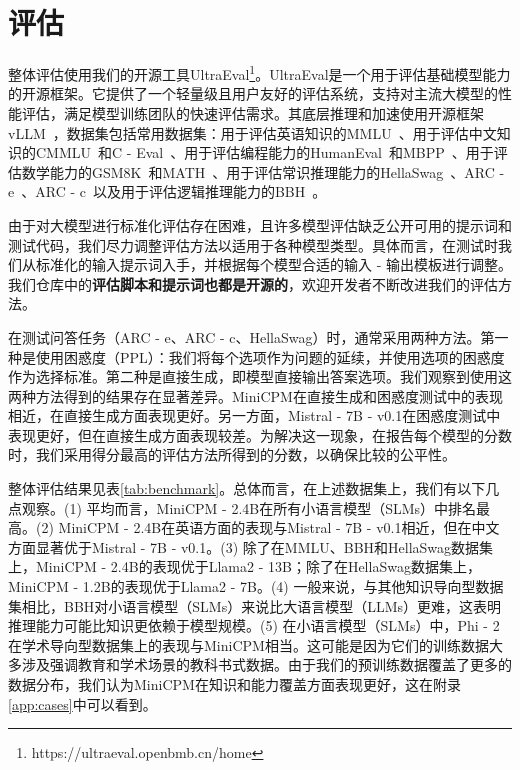 \section{评估}
\label{sec:evaluation}
整体评估使用我们的开源工具UltraEval\footnote{https://ultraeval.openbmb.cn/home}。UltraEval是一个用于评估基础模型能力的开源框架。它提供了一个轻量级且用户友好的评估系统，支持对主流大模型的性能评估，满足模型训练团队的快速评估需求。其底层推理和加速使用开源框架vLLM~\citep{kwon2023efficient}，数据集包括常用数据集：用于评估英语知识的MMLU~\citep{hendrycks2020measuring}、用于评估中文知识的CMMLU~\citep{li2024cmmlu}和C - Eval~\citep{huang2024c}、用于评估编程能力的HumanEval~\citep{chen2021evaluating}和MBPP~\citep{austin2021program}、用于评估数学能力的GSM8K~\citep{cobbe2021training}和MATH~\citep{hendrycks2021measuring}、用于评估常识推理能力的HellaSwag~\citep{zellers2019hellaswag}、ARC - e~\citep{clark2018think}、ARC - c~\citep{clark2018think}以及用于评估逻辑推理能力的BBH~\citep{suzgun2022challenging}。

由于对大模型进行标准化评估存在困难，且许多模型评估缺乏公开可用的提示词和测试代码，我们尽力调整评估方法以适用于各种模型类型。具体而言，在测试时我们从标准化的输入提示词入手，并根据每个模型合适的输入 - 输出模板进行调整。我们仓库中的\textbf{评估脚本和提示词也都是开源的}，欢迎开发者不断改进我们的评估方法。

在测试问答任务（ARC - e、ARC - c、HellaSwag）时，通常采用两种方法。第一种是使用困惑度（PPL）：我们将每个选项作为问题的延续，并使用选项的困惑度作为选择标准。第二种是直接生成，即模型直接输出答案选项。我们观察到使用这两种方法得到的结果存在显著差异。MiniCPM在直接生成和困惑度测试中的表现相近，在直接生成方面表现更好。另一方面，Mistral - 7B - v0.1在困惑度测试中表现更好，但在直接生成方面表现较差。为解决这一现象，在报告每个模型的分数时，我们采用得分最高的评估方法所得到的分数，以确保比较的公平性。

整体评估结果见表\ref{tab:benchmark}。总体而言，在上述数据集上，我们有以下几点观察。(1) 平均而言，MiniCPM - 2.4B在所有小语言模型（SLMs）中排名最高。(2) MiniCPM - 2.4B在英语方面的表现与Mistral - 7B - v0.1相近，但在中文方面显著优于Mistral - 7B - v0.1。(3) 除了在MMLU、BBH和HellaSwag数据集上，MiniCPM - 2.4B的表现优于Llama2 - 13B；除了在HellaSwag数据集上，MiniCPM - 1.2B的表现优于Llama2 - 7B。(4) 一般来说，与其他知识导向型数据集相比，BBH对小语言模型（SLMs）来说比大语言模型（LLMs）更难，这表明推理能力可能比知识更依赖于模型规模。(5) 在小语言模型（SLMs）中，Phi - 2在学术导向型数据集上的表现与MiniCPM相当。这可能是因为它们的训练数据大多涉及强调教育和学术场景的教科书式数据。由于我们的预训练数据覆盖了更多的数据分布，我们认为MiniCPM在知识和能力覆盖方面表现更好，这在附录\ref{app:cases}中可以看到。 

